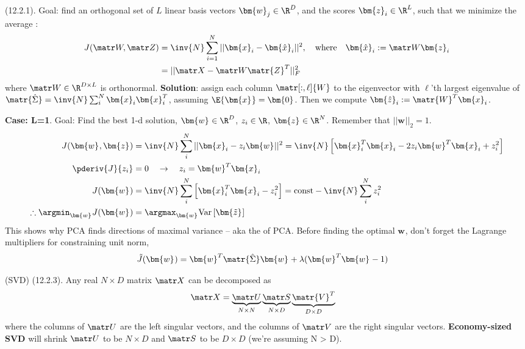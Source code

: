 \documentclass[11pt]{article}
\renewcommand\vec[2][]{\bm{#2}_{#1}}
\newcommand\myspace[1][]{\vspace{#1\bigskipamount}}
\newcommand\p{\Needspace{10\baselineskip} \noindent}
\begin{document}
\myspace
\p {} (12.2.1). Goal: find an orthogonal set of $L$ linear basis vectors $\vec[j]{w} \in \R^D$, and the scores $\vec[i]{z} \in \R^L$, such that we minimize the average :
\begin{align}
	J(\matr W, \matr Z)
		&= \inv{N} \sum_{i=1}^{N} || \vec[i]{x} - \vec[i]{\hat x} ||^2, 
		\quad\text{where}\quad
		\vec[i]{\hat x} := \matr W \vec[i]{z} \\
		&= || \matr X - \matr W \matr{Z}^T ||_F^2
\end{align}
where $\matr W \in \R^{D \times L}$ is orthonormal. \textbf{Solution}: assign each column $\matr[:,\ell]{W}$ to the eigenvector with $\ell$'th largest eigenvalue of $\matr{\hat \Sigma} = \inv{N} \sum_i^N \vec[i]{x}\vec[i]{x}^T$, assuming $\E{\vec x} = \vec{0}$. Then we compute $\vec[i]{\hat z} := \matr{W}^T \vec[i]{x}$. 

\begin{example}
	\textbf{Case: L=1}. Goal: Find the best 1-d solution, $\vec{w} \in \R^D$, $z_i \in \R$, $\vec z \in \R^N$. Remember that $||\vec w||_2 = 1$. 
	\begin{align}
		J(\vec w, \vec{z})
			&= \inv{N} \sum_i^N || \vec[i]{x} - z_i \vec{w} ||^2 
			= \inv{N} \left[   \vec[i]{x}^T \vec[i]{x} - 2 z_i \vec{w}^T \vec[i]{x} + z_i^2  \right] \\
		\pderiv{J}{z_i}
			&= 0 \quad\rightarrow\quad z_i = \vec{w}^T\vec[i]{x} \\
		J(\vec w)
			&= \inv{N}\sum_i^N \left[ \vec[i]{x}^T\vec[i]{x} - z_i^2 \right]
			= \text{const} - \inv{N} \sum_i^N z_i^2 \\
		\therefore
		\argmin_{\vec w} J(\vec w) 
			&= \argmax_{\vec w} \text{Var}\left[  \vec{\tilde z} \right]
	\end{align}
	This shows why PCA finds directions of maximal variance -- aka the  of PCA. Before finding the optimal $\vec w$, don't forget the Lagrange multipliers for constraining unit norm,
	\begin{align}
		\tilde{J}(\vec w)
			&= \vec{w}^T \matr{\hat \Sigma} \vec{w} + \lambda (\vec{w}^T \vec w - 1)
	\end{align}
\end{example}

\myspace
\p {} (SVD) (12.2.3). Any real $N \times D$ matrix $\matr X$ can be decomposed as
\begin{align}
	\matr X
		&= \underbrace{\matr U}_{N \times N} \underbrace{\matr S}_{N \times D} \underbrace{\matr{V}^T}_{D \times D}
\end{align}
where the columns of $\matr U$ are the left singular vectors, and the columns of $\matr V$ are the right singular vectors. \textbf{Economy-sized SVD} will shrink $\matr U$ to be $N \times D$ and $\matr S$ to be $D \times D$ (we're assuming N > D). 
\end{document}
